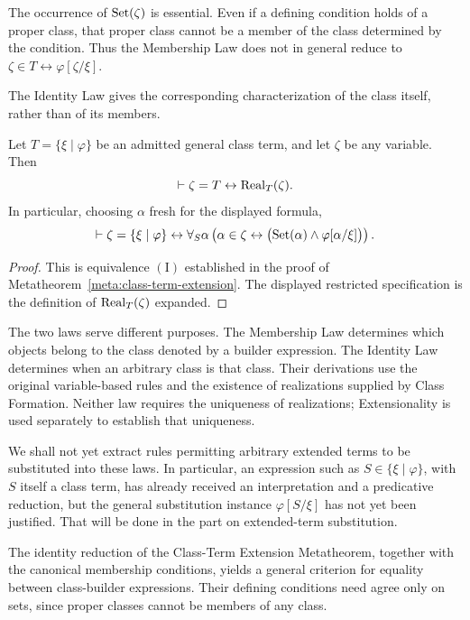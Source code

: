 The occurrence of \(\operatorname{Set}(\zeta)\) is essential. Even if a defining
condition holds of a proper class, that proper class cannot be a
member of the class determined by the condition. Thus the
Membership Law does not in general reduce to
\(\zeta\in T\leftrightarrow\varphi[\zeta/\xi]\).

The Identity Law gives the corresponding characterization of the
class itself, rather than of its members.

\begin{metatheorem}
\label{meta:identity-law-for-class-terms}
Let \(T=\{\xi\mid\varphi\}\) be an admitted general class term,
and let \(\zeta\) be any variable. Then
\[
\vdash
\zeta=T
\leftrightarrow
\operatorname{Real}_T(\zeta).
\]
In particular, choosing \(\alpha\) fresh for the displayed formula,
\[
\vdash
\zeta=\{\xi\mid\varphi\}
\leftrightarrow
\forall_S\alpha\left(
\alpha\in\zeta
\leftrightarrow
\bigl(\operatorname{Set}(\alpha)\land\varphi[\alpha/\xi]\bigr)
\right).
\]
\end{metatheorem}

\begin{proof}
This is equivalence \((\mathrm{I})\) established in the proof of
Metatheorem~\ref{meta:class-term-extension}. The displayed
restricted specification is the definition of
\(\operatorname{Real}_T(\zeta)\) expanded.
\end{proof}

The two laws serve different purposes. The Membership Law determines
which objects belong to the class denoted by a builder expression.
The Identity Law determines when an arbitrary class is that class.
Their derivations use the original variable-based rules and the
existence of realizations supplied by Class Formation. Neither law
requires the uniqueness of realizations; Extensionality is used
separately to establish that uniqueness.

We shall not yet extract rules permitting arbitrary extended terms
to be substituted into these laws. In particular, an expression such
as \(S\in\{\xi\mid\varphi\}\), with \(S\) itself a class term,
has already received an interpretation and a predicative reduction,
but the general substitution instance
\(\varphi[S/\xi]\) has not yet been justified. That will be done
in the part on extended-term substitution.


The identity reduction of the Class-Term Extension Metatheorem,
together with the canonical membership conditions, yields a general
criterion for equality between class-builder expressions. Their
defining conditions need agree only on sets, since proper classes
cannot be members of any class.

